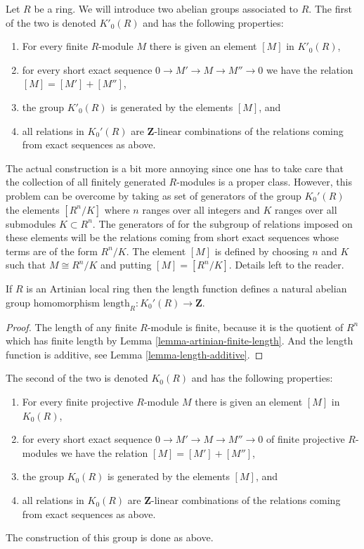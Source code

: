 \noindent
Let $R$ be a ring. We will introduce two abelian groups associated
to $R$. The first of the two is denoted $K'_0(R)$ and has the following
properties:
\begin{enumerate}
\item For every finite $R$-module $M$ there is given an element $[M]$ in
$K'_0(R)$,
\item for every short exact sequence $0 \to M' \to M \to M'' \to 0$
we have the relation $[M] = [M'] + [M'']$, 
\item the group $K'_0(R)$ is generated by the elements $[M]$, and
\item all relations in $K_0'(R)$ are $\mathbf{Z}$-linear combinations
of the relations coming from exact sequences as above.
\end{enumerate}
The actual construction is a bit more annoying since one has to take care
that the collection of all finitely generated $R$-modules is a proper class.
However, this problem can be overcome by taking as set of generators
of the group $K_0'(R)$ the elements $[R^n/K]$ where $n$ ranges over
all integers and $K$ ranges over all submodules $K \subset R^n$.
The generators of for the subgroup of relations imposed on these elements
will be the relations coming from short exact sequences whose terms
are of the form $R^n/K$. The element $[M]$ is defined by 
choosing $n$ and $K$ such that $M \cong R^n/K$ and putting
$[M] = [R^n/K]$. Details left to the reader.

\begin{lemma}
\label{lemma-length-K0}
If $R$ is an Artinian local ring then the length function
defines a natural abelian group homomorphism
$\text{length}_R : K_0'(R) \to \mathbf{Z}$.
\end{lemma}

\begin{proof}
The length of any finite $R$-module is finite,
because it is the quotient of $R^n$ which has finite length by
Lemma \ref{lemma-artinian-finite-length}. And the length function
is additive, see Lemma \ref{lemma-length-additive}.
\end{proof}

\noindent
The second of the two is denoted $K_0(R)$ and has the following
properties:
\begin{enumerate}
\item For every finite projective $R$-module $M$ there
is given an element $[M]$ in $K_0(R)$,
\item for every short exact sequence $0 \to M' \to M \to M'' \to 0$
of finite projective $R$-modules we have the relation $[M] = [M'] + [M'']$, 
\item the group $K_0(R)$ is generated by the elements $[M]$, and
\item all relations in $K_0(R)$ are $\mathbf{Z}$-linear combinations
of the relations coming from exact sequences as above.
\end{enumerate}
The construction of this group is done as above.

